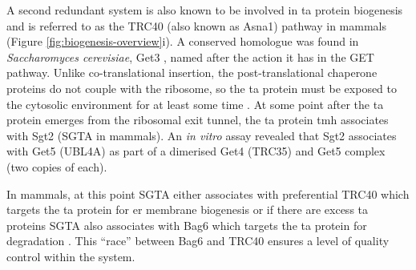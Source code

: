 A second redundant system is also known to be involved in \gls{ta} protein biogenesis and is referred to as the TRC40 (also known as Asna1) pathway in mammals (Figure \ref{fig:biogenesis-overview}i).
A conserved homologue was found in \textit{Saccharomyces cerevisiae}, Get3 \cite{Schuldiner2008}, named after the action it has in the GET pathway.
Unlike co-translational insertion, the post\--translational chaperone proteins do not couple with the ribosome, so the \gls{ta} protein must be exposed to the cytosolic environment for at least some time \cite{Guna2018}.
At some point after the \gls{ta} protein emerges from the ribosomal exit tunnel, the \gls{ta} protein \gls{tmh} associates with Sgt2 (SGTA in mammals).
An \textit{in vitro} assay revealed that Sgt2 associates with Get5  \cite{Wang2010} (UBL4A) as part of a dimerised Get4 (TRC35) and Get5 complex (two copies of each)\cite{Chang2010, Chang2012, Chartron2010, Chartron2012}.

In mammals, at this point SGTA either associates with preferential TRC40 which targets the \gls{ta} protein for \gls{er} membrane biogenesis or if there are excess \gls{ta} proteins SGTA also associates with Bag6 which targets the \gls{ta} protein for degradation \cite{Shao2017}.
This ``race'' between Bag6 and TRC40 ensures a level of quality control within the system.

